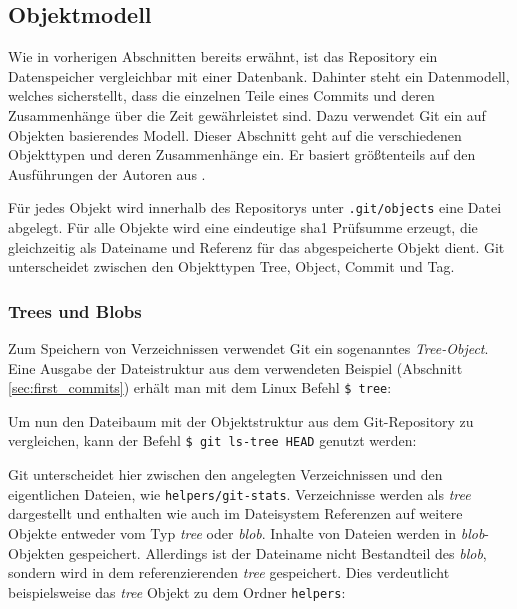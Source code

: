 \subsection{Objektmodell}\label{sec:objectmodel}
Wie in vorherigen Abschnitten bereits erwähnt, ist das Repository ein
Datenspeicher vergleichbar mit einer Datenbank. Dahinter steht ein Datenmodell,
welches sicherstellt, dass die einzelnen Teile eines Commits und deren
Zusammenhänge über die Zeit gewährleistet sind. Dazu verwendet Git ein auf
Objekten basierendes Modell. Dieser Abschnitt geht auf die verschiedenen
Objekttypen und deren Zusammenhänge ein. Er basiert größtenteils auf den
Ausführungen der Autoren aus \cite[S.~49-59]{gitosp}.

Für jedes Objekt wird innerhalb des Repositorys unter \texttt{.git/objects}
eine Datei abgelegt. Für alle Objekte wird eine eindeutige \gls{sha1}
Prüfsumme erzeugt, die gleichzeitig als Dateiname und Referenz für das
abgespeicherte Objekt dient. Git unterscheidet zwischen den Objekttypen Tree,
Object, Commit und Tag.

\subsubsection{Trees und Blobs}\label{sec:treeblobobjects}
Zum Speichern von Verzeichnissen verwendet Git ein sogenanntes
\textit{Tree-Object}. Eine Ausgabe der Dateistruktur aus dem verwendeten
Beispiel (Abschnitt \ref{sec:first_commits}) erhält man mit dem Linux Befehl
\texttt{\$ tree}:


Um nun den Dateibaum mit der Objektstruktur aus dem Git-Repository zu
vergleichen, kann der Befehl \texttt{\$ git ls-tree HEAD} genutzt werden:


Git unterscheidet hier zwischen den angelegten Verzeichnissen und den
eigentlichen Dateien, wie \texttt{helpers/git-stats}. Verzeichnisse werden als
\textit{tree} dargestellt und enthalten wie auch im Dateisystem Referenzen auf
weitere Objekte entweder vom Typ \textit{tree} oder \textit{blob}.  Inhalte von
Dateien werden in \textit{blob}-Objekten gespeichert. Allerdings ist der
Dateiname nicht Bestandteil des \textit{blob}, sondern wird in dem
referenzierenden \textit{tree} gespeichert. Dies verdeutlicht beispielsweise
das \textit{tree} Objekt zu dem Ordner \texttt{helpers}:


